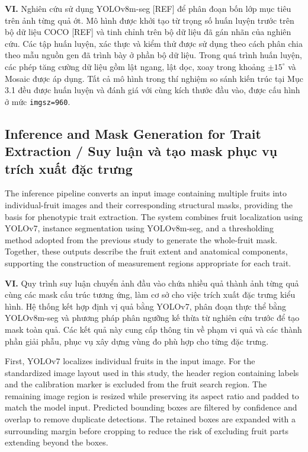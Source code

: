 \documentclass[final,1p,11pt,longtitle]{elsarticle}
\newenvironment{viet}{\par\smallskip\begingroup\color{viColor}\noindent\textbf{VI. }\ignorespaces}{\par\endgroup\smallskip}
\begin{document}
\begin{viet}
Nghiên cứu sử dụng YOLOv8m-seg [REF] để phân đoạn bốn lớp mục tiêu trên ảnh từng quả ớt. Mô hình được khởi tạo từ trọng số huấn luyện trước trên bộ dữ liệu COCO [REF] và tinh chỉnh trên bộ dữ liệu đã gán nhãn của nghiên cứu. Các tập huấn luyện, xác thực và kiểm thử được sử dụng theo cách phân chia theo mẫu nguồn gen đã trình bày ở phần bộ dữ liệu. Trong quá trình huấn luyện, các phép tăng cường dữ liệu gồm lật ngang, lật dọc, xoay trong khoảng $\pm15^{\circ}$ và Mosaic được áp dụng. Tất cả mô hình trong thí nghiệm so sánh kiến trúc tại Mục 3.1 đều được huấn luyện và đánh giá với cùng kích thước đầu vào, được cấu hình ở mức \texttt{imgsz=960}.
\end{viet}


\subsection*{Inference and Mask Generation for Trait Extraction / {\color{viColor} Suy luận và tạo mask phục vụ trích xuất đặc trưng}}

The inference pipeline converts an input image containing multiple fruits into individual-fruit images and their corresponding structural masks, providing the basis for phenotypic trait extraction. The system combines fruit localization using YOLOv7, instance segmentation using YOLOv8m-seg, and a thresholding method adopted from the previous study to generate the whole-fruit mask. Together, these outputs describe the fruit extent and anatomical components, supporting the construction of measurement regions appropriate for each trait.

\begin{viet}
Quy trình suy luận chuyển ảnh đầu vào chứa nhiều quả thành ảnh từng quả cùng các mask cấu trúc tương ứng, làm cơ sở cho việc trích xuất đặc trưng kiểu hình. Hệ thống kết hợp định vị quả bằng YOLOv7, phân đoạn thực thể bằng YOLOv8m-seg và phương pháp phân ngưỡng kế thừa từ nghiên cứu trước để tạo mask toàn quả. Các kết quả này cung cấp thông tin về phạm vi quả và các thành phần giải phẫu, phục vụ xây dựng vùng đo phù hợp cho từng đặc trưng.
\end{viet}

First, YOLOv7 localizes individual fruits in the input image. For the standardized image layout used in this study, the header region containing labels and the calibration marker is excluded from the fruit search region. The remaining image region is resized while preserving its aspect ratio and padded to match the model input. Predicted bounding boxes are filtered by confidence and overlap to remove duplicate detections. The retained boxes are expanded with a surrounding margin before cropping to reduce the risk of excluding fruit parts extending beyond the boxes.
\end{document}
